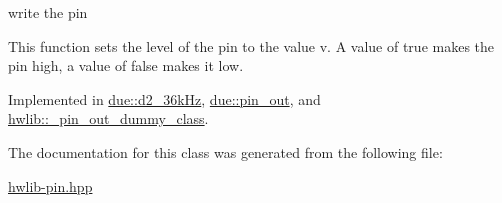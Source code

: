 write the pin 

This function sets the level of the pin to the value v. A value of true makes the pin high, a value of false makes it low. 

Implemented in \hyperlink{classdue_1_1d2__36k_hz_abdb0b8ee44017ecfaf37fcbf9e0ba126}{due\+::d2\+\_\+36k\+Hz}, \hyperlink{classdue_1_1pin__out_a65a516d8139c1efb217d90f5bdffe0a4}{due\+::pin\+\_\+out}, and \hyperlink{classhwlib_1_1__pin__out__dummy__class_a2a1c7ef6046fbf45a92f5036632e4655}{hwlib\+::\+\_\+pin\+\_\+out\+\_\+dummy\+\_\+class}.



The documentation for this class was generated from the following file\+:\begin{DoxyCompactItemize}
\item 
\hyperlink{hwlib-pin_8hpp}{hwlib-\/pin.\+hpp}\end{DoxyCompactItemize}
